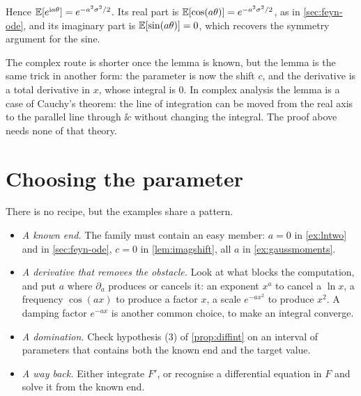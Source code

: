 Hence $\mathbb{E}[e^{\mathrm{i} a\theta}]=e^{-a^2\sigma^2/2}$. Its real part is
$\mathbb{E}[\cos(a\theta)]=e^{-a^2\sigma^2/2}$, as in \cref{sec:feyn-ode}, and its
imaginary part is $\mathbb{E}[\sin(a\theta)]=0$, which recovers the symmetry
argument for the sine.

The complex route is shorter once the lemma is known, but the lemma is
the same trick in another form: the parameter is now the shift $c$, and
the derivative is a total derivative in $x$, whose integral is $0$. In
complex analysis the lemma is a case of Cauchy's theorem: the line of
integration can be moved from the real axis to the parallel line through
$\ii c$ without changing the integral. The proof above needs none of that
theory.

\section{Choosing the parameter}
\label{sec:feyn-choose}

There is no recipe, but the examples share a pattern.
\begin{itemize}[nosep]
  \item \emph{A known end.} The family must contain an easy member:
        $a=0$ in \cref{ex:lntwo} and in \cref{sec:feyn-ode}, $c=0$ in
        \cref{lem:imagshift}, all $a$ in \cref{ex:gaussmoments}.
  \item \emph{A derivative that removes the obstacle.} Look at what
        blocks the computation, and put $a$ where $\partial_a$ produces
        or cancels it: an exponent $x^a$ to cancel a $\ln x$, a
        frequency $\cos(ax)$ to produce a factor $x$, a scale
        $e^{-ax^2}$ to produce $x^2$. A damping factor $e^{-ax}$ is
        another common choice, to make an integral converge.
  \item \emph{A domination.} Check hypothesis (3) of
        \cref{prop:diffint} on an interval of parameters that contains
        both the known end and the target value.
  \item \emph{A way back.} Either integrate $F'$, or recognise a
        differential equation in $F$ and solve it from the known end.
\end{itemize}
